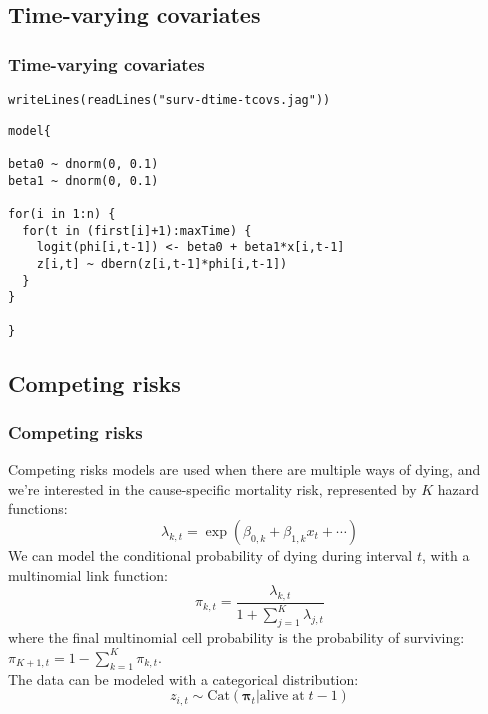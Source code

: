 \documentclass[color=usenames,dvipsnames]{beamer}\usepackage[]{graphicx}\usepackage[]{color}
\makeatletter
\newcommand{\hlstr}[1]{\textcolor[rgb]{0.749,0.012,0.012}{#1}}%
\newcommand{\hlstd}[1]{\textcolor[rgb]{0,0,0}{#1}}%
\newcommand{\hlkwd}[1]{\textcolor[rgb]{0.004,0.004,0.506}{#1}}%
\newenvironment{kframe}{%
 \def\at@end@of@kframe{}%
 \ifinner\ifhmode%
  \def\at@end@of@kframe{\end{minipage}}%
  \begin{minipage}{\columnwidth}%
 \fi\fi%
 \def\FrameCommand##1{\hskip\@totalleftmargin \hskip-\fboxsep
 \colorbox{shadecolor}{##1}\hskip-\fboxsep
     \hskip-\linewidth \hskip-\@totalleftmargin \hskip\columnwidth}%
 \MakeFramed {\advance\hsize-\width
   \@totalleftmargin\z@ \linewidth\hsize
   \@setminipage}}%
 {\par\unskip\endMakeFramed%
 \at@end@of@kframe}
\newenvironment{knitrout}{}{} %
\makeatother
\begin{document}
\subsection{Time-varying covariates}



\begin{frame}[fragile]
  \frametitle{Time-varying covariates}
\begin{knitrout}
\color{fgcolor}\begin{kframe}
\begin{alltt}
\hlkwd{writeLines}\hlstd{(}\hlkwd{readLines}\hlstd{(}\hlstr{"surv-dtime-tcovs.jag"}\hlstd{))}
\end{alltt}
\end{kframe}
\end{knitrout}
\begin{knitrout}
\color{fgcolor}\begin{kframe}
\begin{verbatim}
model{

beta0 ~ dnorm(0, 0.1)
beta1 ~ dnorm(0, 0.1)

for(i in 1:n) {
  for(t in (first[i]+1):maxTime) {
    logit(phi[i,t-1]) <- beta0 + beta1*x[i,t-1]
    z[i,t] ~ dbern(z[i,t-1]*phi[i,t-1])
  }
}

}
\end{verbatim}
\end{kframe}
\end{knitrout}
\end{frame}




\subsection{Competing risks}


\begin{frame}
  \frametitle{Competing risks}
  \small
  Competing risks models are used when there are multiple ways of
  dying, and we're interested in the cause-specific mortality risk,
  represented by $K$ hazard functions: 
  \[
    \lambda_{k,t} = \exp(\beta_{0,k} + \beta_{1,k}x_{t} + \cdots)
  \]
  \pause
  We can model the conditional probability of dying during interval
  $t$, with a multinomial link function:
  \[
    \pi_{k,t} = \frac{\lambda_{k,t}}{1+\sum_{j=1}^K \lambda_{j,t}}
  \]
  where the final multinomial cell probability is the probability of
  surviving: $\pi_{K+1,t} = 1-\sum_{k=1}^K \pi_{k,t}$. \\
  \pause
  \vfill
  The data can be modeled with a categorical distribution:
  \[
    z_{i,t} \sim \mathrm{Cat}({\bm \pi}_t | \mathrm{alive\; at\;} t-1)
  \]
\end{frame}
\end{document}
